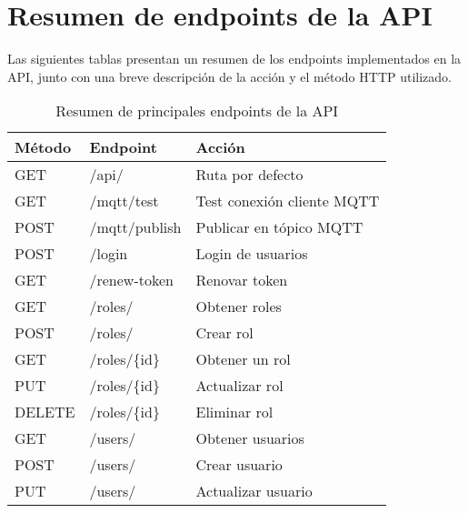 \chapter{Resumen de endpoints de la API}

\label{AppendixB}

Las siguientes tablas presentan un resumen de los endpoints implementados en la
API, junto con una breve descripción de la acción y el método HTTP utilizado.

\begin{table}[H]
    \centering
    \caption[Resumen de principales endpoints de la API]{Resumen de principales endpoints de la API}
    \begin{tabular}{l l l}
        \toprule
        \textbf{Método} & \textbf{Endpoint}      & \textbf{Acción}              \\
        \midrule
        GET             & /api/                  & Ruta por defecto             \\
        GET             & /mqtt/test             & Test conexión cliente MQTT   \\
        POST            & /mqtt/publish          & Publicar en tópico MQTT      \\
        \midrule
        POST            & /login                 & Login de usuarios            \\
        GET             & /renew-token           & Renovar token                \\
        \midrule
        GET             & /roles/                & Obtener roles                \\
        POST            & /roles/                & Crear rol                    \\
        GET             & /roles/\{id\}          & Obtener un rol               \\
        PUT             & /roles/\{id\}          & Actualizar rol               \\
        DELETE          & /roles/\{id\}          & Eliminar rol                 \\
        \midrule
        GET             & /users/                & Obtener usuarios             \\
        POST            & /users/                & Crear usuario                \\
        PUT             & /users/                & Actualizar usuario           \\

\end{tabular}
\end{table}
